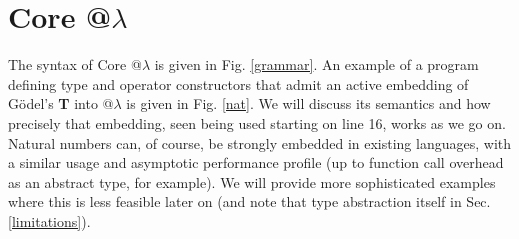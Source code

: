 \documentclass[9pt,preprint]{sigplanconf}
\begin{document}
\section{Core @$\lambda$}\label{core}

%

The syntax of Core @$\lambda$ is given in Fig. \ref{grammar}. An example of a program defining type and operator constructors that admit an active embedding of G\"odel's \textbf{T} into @$\lambda$ is given in Fig. \ref{nat}. We will discuss its semantics and how precisely that embedding, seen being used starting on line 16, works as we go on. Natural numbers can, of course, be strongly embedded in existing languages, with a similar usage and asymptotic performance profile (up to function call overhead as an abstract type, for example). We will provide more sophisticated examples where this is less feasible later on (and note that type abstraction itself in Sec. \ref{limitations}). %
\end{document}
